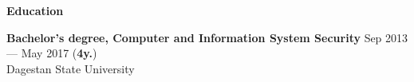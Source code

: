 \documentclass{resume}
\begin{document}

\begin{rSection}{\textbf{Education}}

\textbf{Bachelor's degree, Computer and Information System Security} \hfill {Sep 2013 --- May 2017 ({\textbf{4y.}})} \\
	  Dagestan State University

\end{rSection}
\end{document}
